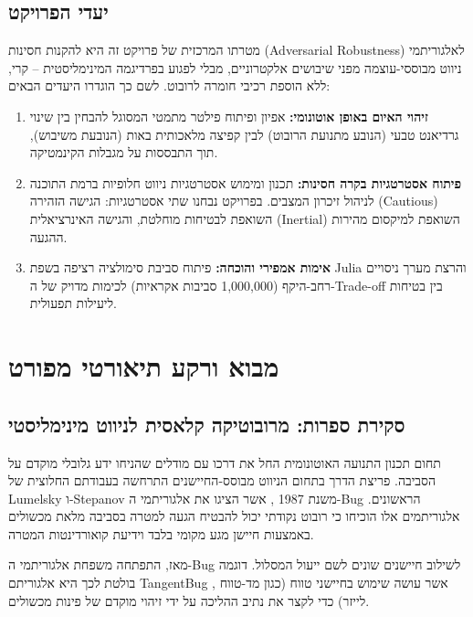 \documentclass[12pt, a4paper]{article}
\begin{document}
\subsection{יעדי הפרויקט}
מטרתו המרכזית של פרויקט זה היא להקנות חסינות (\textenglish{Adversarial Robustness}) לאלגוריתמי ניווט מבוססי-עוצמה מפני שיבושים אלקטרוניים, מבלי לפגוע בפרדיגמה המינימליסטית – קרי, ללא הוספת רכיבי חומרה לרובוט. לשם כך הוגדרו היעדים הבאים:
\begin{enumerate}
    \item \textbf{זיהוי האיום באופן אוטונומי:} אפיון ופיתוח פילטר מתמטי המסוגל להבחין בין שינוי גרדיאנט טבעי (הנובע מתנועת הרובוט) לבין קפיצה מלאכותית באות (הנובעת משיבוש), תוך התבססות על מגבלות הקינמטיקה.
    \item \textbf{פיתוח אסטרטגיות בקרה חסינות:} תכנון ומימוש אסטרטגיות ניווט חלופיות ברמת התוכנה לניהול זיכרון המצבים. בפרויקט נבחנו שתי אסטרטגיות: הגישה הזהירה (\textenglish{Cautious}) השואפת לבטיחות מוחלטת, והגישה האינרציאלית (\textenglish{Inertial}) השואפת למיקסום מהירות ההגעה.
    \item \textbf{אימות אמפירי והוכחה:} פיתוח סביבת סימולציה רציפה בשפת \textenglish{Julia} והרצת מערך ניסויים רחב-היקף (1,000,000 סביבות אקראיות) לכימות מדויק של ה-\textenglish{Trade-off} בין בטיחות ליעילות תפעולית.
\end{enumerate}


\section{מבוא ורקע תיאורטי מפורט}

\subsection{סקירת ספרות: מרובוטיקה קלאסית לניווט מינימליסטי}
תחום תכנון התנועה האוטונומית החל את דרכו עם מודלים שהניחו ידע גלובלי מוקדם על הסביבה. פריצת הדרך בתחום הניווט מבוסס-החיישנים התרחשה בעבודתם החלוצית של \textenglish{Lumelsky} ו-\textenglish{Stepanov} משנת 1987 \cite{lumelsky1987path}, אשר הציגו את אלגוריתמי ה-\textenglish{Bug} הראשונים. אלגוריתמים אלו הוכיחו כי רובוט נקודתי יכול להבטיח הגעה למטרה בסביבה מלאת מכשולים באמצעות חיישן מגע מקומי בלבד וידיעת קואורדינטות המטרה.

מאז, התפתחה משפחת אלגוריתמי ה-\textenglish{Bug} לשילוב חיישנים שונים לשם ייעול המסלול. דוגמה בולטת לכך היא אלגוריתם \textenglish{TangentBug} \cite{kamon1998tangentbug}, אשר עושה שימוש בחיישני טווח (כגון מד-טווח לייזר) כדי לקצר את נתיב ההליכה על ידי זיהוי מוקדם של פינות מכשולים. 
\end{document}
